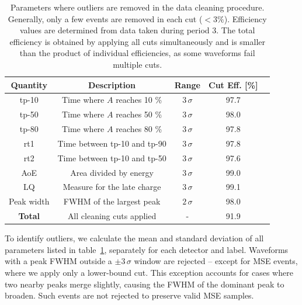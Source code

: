 \begin{table}
\centering
\caption{Parameters where outliers are removed in the data cleaning procedure. Generally, only a few events are removed in each cut ($< 3\%$). Efficiency values are determined from data taken during period 3. The total efficiency is obtained by applying all cuts simultaneously and is smaller than the product of individual efficiencies, as some waveforms fail multiple cuts. }
\begin{tabular}{||c | c | c | c |c ||} 
 \hline
 \textbf{Quantity} & \textbf{Description} & \textbf{Range} & \textbf{Cut Eff.} [\%] \\ 
 \hline
 tp-10 & Time where $A$ reaches 10 \%  	& $3 \,\sigma$ & 97.7\\ 
 \hline
 tp-50 & Time where $A$ reaches 50 \% 	& $3 \,\sigma$ & 98.0 \\ 
 \hline
 tp-80 & Time where $A$ reaches 80 \% 	& $3 \,\sigma$ & 97.8 \\
 \hline
 rt1 & Time between tp-10 and tp-90 				& $3 \,\sigma$ & 97.8 \\
 \hline
 rt2 & Time between tp-10 and tp-50 				& $3 \,\sigma$ & 97.6 \\ 
 \hline
 AoE & Area divided by energy & $3 \,\sigma$ & 99.0 \\
 \hline
 LQ & Measure for the late charge 			& $3 \,\sigma$ & 99.1 \\
 \hline
 Peak width & FWHM of the largest peak 		& $2 \,\sigma$ & 98.0 \\
 \hline
 \textbf{Total} & All cleaning cuts applied & - & 91.9 \\
 \hline
\end{tabular}
\label{tab:Data_cleaning_param}
\end{table}

To identify outliers, we calculate the mean and standard deviation of all parameters listed in table~\ref{tab:Data_cleaning_param}, separately for each detector and label. Waveforms with a peak FWHM outside a $ \pm 3 \,\sigma$ window are rejected -- except for MSE events, where we apply only a lower-bound cut. 
This exception accounts for cases where two nearby peaks merge slightly, causing the FWHM of the dominant peak to broaden. Such events are not rejected to preserve valid MSE samples. 

